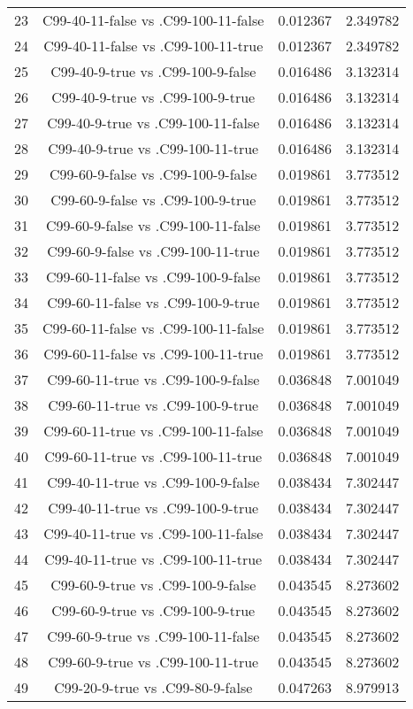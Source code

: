 \documentclass[a4paper,10pt]{article}
\begin{document}
\begin{landscape}
\begin{table}[!htp]
\begin{tabular}{cccc}
23&C99-40-11-false vs .C99-100-11-false&0.012367&2.349782\\
24&C99-40-11-false vs .C99-100-11-true&0.012367&2.349782\\
25&C99-40-9-true vs .C99-100-9-false&0.016486&3.132314\\
26&C99-40-9-true vs .C99-100-9-true&0.016486&3.132314\\
27&C99-40-9-true vs .C99-100-11-false&0.016486&3.132314\\
28&C99-40-9-true vs .C99-100-11-true&0.016486&3.132314\\
29&C99-60-9-false vs .C99-100-9-false&0.019861&3.773512\\
30&C99-60-9-false vs .C99-100-9-true&0.019861&3.773512\\
31&C99-60-9-false vs .C99-100-11-false&0.019861&3.773512\\
32&C99-60-9-false vs .C99-100-11-true&0.019861&3.773512\\
33&C99-60-11-false vs .C99-100-9-false&0.019861&3.773512\\
34&C99-60-11-false vs .C99-100-9-true&0.019861&3.773512\\
35&C99-60-11-false vs .C99-100-11-false&0.019861&3.773512\\
36&C99-60-11-false vs .C99-100-11-true&0.019861&3.773512\\
37&C99-60-11-true vs .C99-100-9-false&0.036848&7.001049\\
38&C99-60-11-true vs .C99-100-9-true&0.036848&7.001049\\
39&C99-60-11-true vs .C99-100-11-false&0.036848&7.001049\\
40&C99-60-11-true vs .C99-100-11-true&0.036848&7.001049\\
41&C99-40-11-true vs .C99-100-9-false&0.038434&7.302447\\
42&C99-40-11-true vs .C99-100-9-true&0.038434&7.302447\\
43&C99-40-11-true vs .C99-100-11-false&0.038434&7.302447\\
44&C99-40-11-true vs .C99-100-11-true&0.038434&7.302447\\
45&C99-60-9-true vs .C99-100-9-false&0.043545&8.273602\\
46&C99-60-9-true vs .C99-100-9-true&0.043545&8.273602\\
47&C99-60-9-true vs .C99-100-11-false&0.043545&8.273602\\
48&C99-60-9-true vs .C99-100-11-true&0.043545&8.273602\\
49&C99-20-9-true vs .C99-80-9-false&0.047263&8.979913\\

\end{tabular}
\end{table}
\end{landscape}
\end{document}
